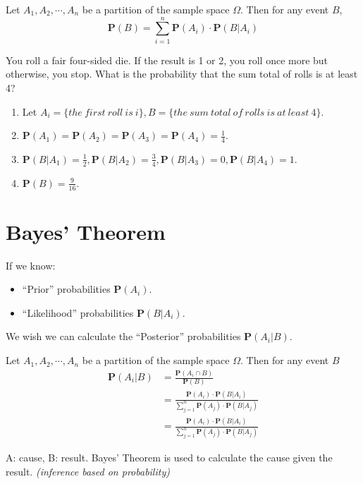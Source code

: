 \begin{theorem}
    Let $A_1, A_2, \cdots, A_n$ be a partition of the sample space $\varOmega$. Then for any event $B$,
    \begin{equation}
        \mathbf{P}(B) = \sum_{i=1}^{n} \mathbf{P}(A_i) \cdot \mathbf{P}(B | A_i)
    \end{equation}
\end{theorem}
\begin{example}
    You roll a fair four-sided die. If the result is 1 or 2, you roll once more but otherwise, you stop. What is the probability that the sum total of rolls is at least 4?
    \begin{solution}
        \begin{enumerate}
            \item Let $A_i = \{the~first~roll~is~i\}, B = \{the~sum~total~of~rolls~is~at~least~4\}$.
            \item $\mathbf{P}(A_1) = \mathbf{P}(A_2) = \mathbf{P}(A_3) = \mathbf{P}(A_4) = \frac{1}{4}$.
            \item $\mathbf{P}(B | A_1) = \frac{1}{2}, \mathbf{P}(B | A_2) = \frac{3}{4}, \mathbf{P}(B | A_3) = 0, \mathbf{P}(B | A_4) = 1$.
            \item $\mathbf{P}(B) = \frac{9}{16}$.
        \end{enumerate}
    \end{solution}
\end{example}


\section{Bayes' Theorem}
If we know:
\begin{itemize}
    \item ``Prior'' probabilities $\mathbf{P}(A_i)$.
    \item ``Likelihood'' probabilities $\mathbf{P}(B | A_i)$.
\end{itemize}
We wish we can calculate the ``Posterior'' probabilities $\mathbf{P}(A_i | B)$. 

\begin{theorem}
    Let $A_1, A_2, \cdots, A_n$ be a partition of the sample space $\varOmega$. Then for any event $B$
    \begin{equation}
    \begin{aligned}
        \mathbf{P}(A_i | B) &= \frac{\mathbf{P}(A_i \cap B)}{\mathbf{P}(B)} \\
        &= \frac{\mathbf{P}(A_i) \cdot \mathbf{P}(B | A_i)}{\sum_{j=1}^{n} \mathbf{P}(A_j) \cdot \mathbf{P}(B | A_j)} \\
        &= \frac{\mathbf{P}(A_i) \cdot \mathbf{P}(B | A_i)}{\sum_{j=1}^{n} \mathbf{P}(A_j) \cdot \mathbf{P}(B | A_j)}
    \end{aligned}
    \end{equation}
\end{theorem}

A: cause, B: result. Bayes' Theorem is used to calculate the cause given the result. \textit{(inference based on probability)}
